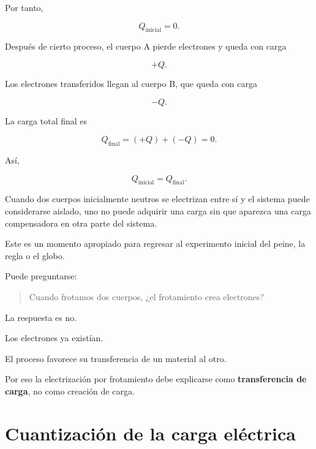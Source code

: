 Por tanto,

\[
Q_{\text{inicial}}=0.
\]

Después de cierto proceso, el cuerpo A pierde electrones y queda con carga

\[
+Q.
\]

Los electrones transferidos llegan al cuerpo B, que queda con carga

\[
-Q.
\]

La carga total final es

\begin{equation}
    Q_{\text{final}}
    =
    (+Q)+(-Q)
    =
    0.
\end{equation}

Así,

\[
Q_{\text{inicial}}
=
Q_{\text{final}}.
\]

\begin{idea}
Cuando dos cuerpos inicialmente neutros se electrizan entre sí y el sistema
puede considerarse aislado, uno no puede adquirir una carga sin que aparezca
una carga compensadora en otra parte del sistema.
\end{idea}



\begin{notapedagogica}
Este es un momento apropiado para regresar al experimento inicial del peine,
la regla o el globo.

Puede preguntarse:

\begin{quote}
Cuando frotamos dos cuerpos, ¿el frotamiento crea electrones?
\end{quote}

La respuesta es no.

Los electrones ya existían.

El proceso favorece su transferencia de un material al otro.

Por eso la electrización por frotamiento debe explicarse como
\textbf{transferencia de carga}, no como creación de carga.
\end{notapedagogica}



\section{Cuantización de la carga eléctrica}

